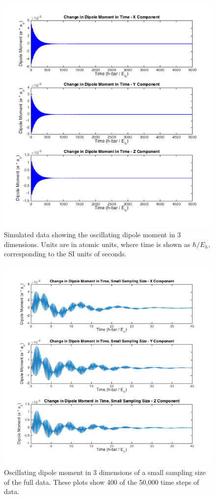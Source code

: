 \documentclass[11pt]{article}
\begin{document}
\begin{figure}[H]
\includegraphics[scale = 0.7]{fulldipolemoment.png}
\caption{Simulated data showing the oscillating dipole moment in 3 dimensions. Units are in atomic units, where time is shown as $\hbar / E_h$, corresponding to the SI units of seconds.}
\label{fig:fulldipole}
\end{figure}

\begin{figure}[H]
\includegraphics[scale = 0.7]{dipole_smallsample.png}
\caption{Oscillating dipole moment in 3 dimensions of a small sampling size of the full data. These plots show 400 of the 50,000 time steps of data.}
\label{fig:partdipole}
\end{figure}
\end{document}
